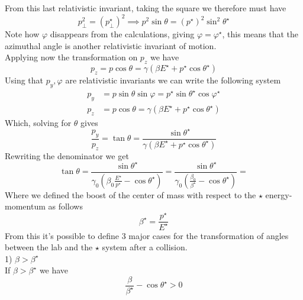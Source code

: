 \documentclass[../admech.tex]{subfiles}
\begin{document}
From this last relativistic invariant, taking the square we therefore must have
\begin{equation}
	p_\perp^2=\left(p_\perp^\star\right)^2\implies p^2\sin\theta=(p^\star)^2\sin^2\theta^\star
	\label{eq:equalitypmomstar}
\end{equation}
Note how $\varphi$ disappears from the calculations, giving $\varphi=\varphi^\star$, this means that the azimuthal angle is another relativistic invariant of motion.\\
Applying now the transformation on $p_z$ we have
\begin{equation}
	p_z=p\cos\theta=\gamma\left(\beta E^\star+p^\star\cos\theta^\star\right)
	\label{eq:pztransmom}
\end{equation}
Using that $p_y,\varphi$ are relativistic invariants we can write the following system
\begin{equation}
	\begin{aligned}
		p_y&=p\sin\theta\sin\varphi=p^\star\sin\theta^\star\cos\varphi^\star\\
		p_z&=p\cos\theta=\gamma\left( \beta E^\star+p^\star\cos\theta^\star \right)
	\end{aligned}
	\label{eq:pypztransmomsys}
\end{equation}
Which, solving for $\theta$ gives
\begin{equation}
	\frac{p_y}{p_z}=\tan\theta=\frac{\sin\theta^\star}{\gamma\left( \beta E^\star+p^\star\cos\theta^\star \right)}
	\label{eq:tanthetatrans}
\end{equation}
Rewriting the denominator we get
\begin{equation}
	\tan\theta=\frac{\sin\theta^\star}{\gamma_0\left( \beta_0\frac{E^\star}{p^\star}-\cos\theta^\star \right)}=\frac{\sin\theta^\star}{\gamma_0\left( \frac{\beta_0}{\beta^\star}-\cos\theta^\star \right)}=
	\label{eq:betastar}
\end{equation}
Where we defined the boost of the center of mass with respect to the $\star$ energy-momentum as follows
\begin{equation}
	\beta^\star=\frac{p^\star}{E^\star}
	\label{eq:betastardef}
\end{equation}
From this it's possible to define 3 major cases for the transformation of angles between the lab and the $\star$ system after a collision.\\
1) $\beta>\beta^\star$\\
If $\beta>\beta^\star$ we have
\begin{equation*}
	\frac{\beta}{\beta^\star}-\cos\theta^\star>0
\end{equation*}
\end{document}
